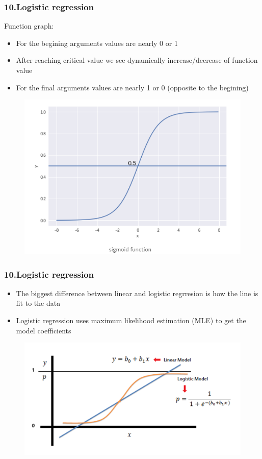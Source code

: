 \documentclass[handout,compress]{beamer} %
\begin{document}
\begin{frame}[allowframebreaks]
\frametitle{10.Logistic regression}
Function graph:
\begin{itemize}
	\item 
	For the begining arguments values are nearly 0 or 1
	\item
	After reaching critical value we see dynamically increase/decrease of function  value
	\item
	For the final arguments values are nearly 1 or 0 (opposite to the begining)	
\end{itemize}
		\begin{figure}[h]
		\includegraphics[scale=0.3]{images/lukasz1.png}
		\end{figure}

\end{frame}

\begin{frame}[allowframebreaks]
\frametitle{10.Logistic regression}
\begin{itemize}
	\item
	The biggest difference between linear and logistic regrresion is how the line is fit to the data
	\item 
	Logistic regression uses maximum likelihood estimation (MLE) to get the model coefficients
	
\end{itemize}
		\begin{figure}[h]
		\includegraphics[scale=0.3]{images/lukasz2.png}
		\end{figure}
\end{frame}
\end{document}
